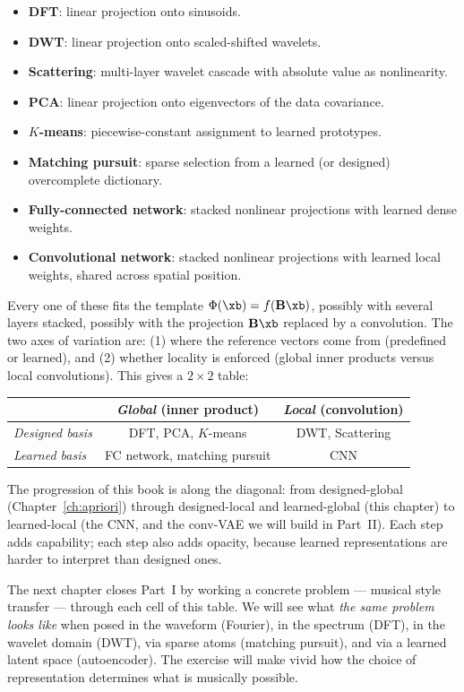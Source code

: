 \begin{itemize}
    \item \textbf{DFT}: linear projection onto sinusoids.
    \item \textbf{DWT}: linear projection onto scaled-shifted wavelets.
    \item \textbf{Scattering}: multi-layer wavelet cascade with absolute
    value as nonlinearity.
    \item \textbf{PCA}: linear projection onto eigenvectors of the data
    covariance.
    \item \textbf{$K$-means}: piecewise-constant assignment to learned
    prototypes.
    \item \textbf{Matching pursuit}: sparse selection from a learned (or
    designed) overcomplete dictionary.
    \item \textbf{Fully-connected network}: stacked nonlinear projections
    with learned dense weights.
    \item \textbf{Convolutional network}: stacked nonlinear projections
    with learned local weights, shared across spatial position.
\end{itemize}

\noindent Every one of these fits the template $\Phi(\xb) = f(\mathbf{B}
\xb)$, possibly with several layers stacked, possibly with the
projection $\mathbf{B}\xb$ replaced by a convolution.  The two
axes of variation are: (1) where the reference vectors come from
(predefined or learned), and (2) whether locality is enforced
(global inner products versus local convolutions).  This gives a $2
\times 2$ table:

\begin{center}
\begin{tabular}{l|cc}
        & \emph{Global} (inner product) & \emph{Local} (convolution) \\ \hline
\emph{Designed basis} & DFT, PCA, $K$-means & DWT, Scattering \\
\emph{Learned basis}  & FC network, matching pursuit & CNN \\
\end{tabular}
\end{center}

The progression of this book is along the diagonal: from designed-global
(Chapter~\ref{ch:apriori}) through designed-local and learned-global
(this chapter) to learned-local (the CNN, and the conv-VAE we will
build in Part~II).  Each step adds capability; each step also adds
opacity, because learned representations are harder to interpret than
designed ones.

The next chapter closes Part~I by working a concrete problem ---
musical style transfer --- through each cell of this table.  We will
see what \emph{the same problem looks like} when posed in the waveform
(Fourier), in the spectrum (DFT), in the wavelet domain (DWT), via
sparse atoms (matching pursuit), and via a learned latent space
(autoencoder).  The exercise will make vivid how the choice of
representation determines what is musically possible.
